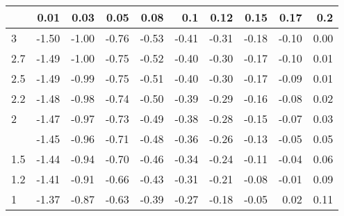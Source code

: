 
\begin{tabular}{lrrrrrrrrr}
\toprule
  & 0.01 & 0.03 & 0.05 & 0.08 & 0.1 & 0.12 & 0.15 & 0.17 & 0.2\\
\midrule
3 & -1.50 & -1.00 & -0.76 & -0.53 & -0.41 & -0.31 & -0.18 & -0.10 & 0.00\\
2.7 & -1.49 & -1.00 & -0.75 & -0.52 & -0.40 & -0.30 & -0.17 & -0.10 & 0.01\\
2.5 & -1.49 & -0.99 & -0.75 & -0.51 & -0.40 & -0.30 & -0.17 & -0.09 & 0.01\\
2.2 & -1.48 & -0.98 & -0.74 & -0.50 & -0.39 & -0.29 & -0.16 & -0.08 & 0.02\\
2 & -1.47 & -0.97 & -0.73 & -0.49 & -0.38 & -0.28 & -0.15 & -0.07 & 0.03\\
\addlinespace
1.7 & -1.45 & -0.96 & -0.71 & -0.48 & -0.36 & -0.26 & -0.13 & -0.05 & 0.05\\
1.5 & -1.44 & -0.94 & -0.70 & -0.46 & -0.34 & -0.24 & -0.11 & -0.04 & 0.06\\
1.2 & -1.41 & -0.91 & -0.66 & -0.43 & -0.31 & -0.21 & -0.08 & -0.01 & 0.09\\
1 & -1.37 & -0.87 & -0.63 & -0.39 & -0.27 & -0.18 & -0.05 & 0.02 & 0.11\\
\bottomrule
\end{tabular}
